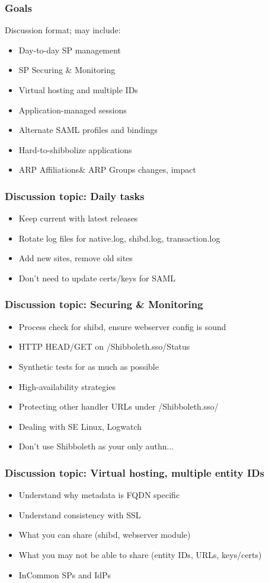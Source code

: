 


\begin{frame}
\frametitle{Goals}

Discussion format; may include:
\begin{itemize}
\item Day-to-day SP management
\item SP Securing \& Monitoring
\item Virtual hosting and multiple IDs
\item Application-managed sessions
\item Alternate SAML profiles and bindings
\item Hard-to-shibbolize applications
\item ARP Affiliations\& ARP Groups changes, impact
\end{itemize}
\end{frame}

\begin{frame}
\frametitle{Discussion topic: Daily tasks}
\begin{itemize}
\item Keep current with latest releases 
\item Rotate log files for native.log, shibd.log, transaction.log 
\item Add new sites, remove old sites 
\item Don't need to update certs/keys for SAML
\end{itemize}
\end{frame}

\begin{frame}
\frametitle{Discussion topic: Securing \& Monitoring}
\begin{itemize}
\item Process check for shibd, ensure webserver config is sound 
\item HTTP HEAD/GET on /Shibboleth.sso/Status 
\item Synthetic tests for as much as possible 
\item High-availability strategies
\item Protecting other handler URLs under /Shibboleth.sso/ 
\item Dealing with SE Linux, Logwatch 
\item Don’t use Shibboleth as your only authn...
\end{itemize}
\end{frame}

\begin{frame}
\frametitle{Discussion topic: Virtual hosting, multiple entity IDs}
\begin{itemize}
\item Understand why metadata is FQDN specific
\item Understand consistency with SSL
\item What you can share (shibd, webserver module)
\item What you may not be able to share (entity IDs, URLs, keys/certs)
\item InCommon SPs and IdPs
\end{itemize}
\end{frame}

